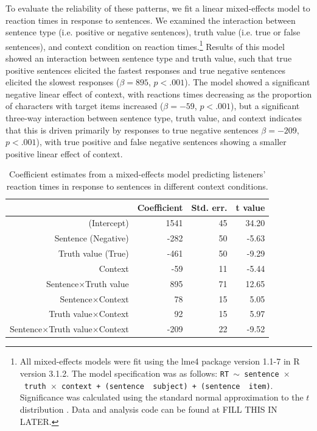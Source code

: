 \documentclass[man]{apa2}
\begin{document}
To evaluate the reliability of these patterns, we fit a linear mixed-effects model to reaction times in response to sentences.  We examined the interaction between sentence type (i.e. positive or negative sentences), truth value (i.e. true or false sentences), and context condition on reaction times.\footnote{All mixed-effects models were fit using the lme4 package version 1.1-7 in R version 3.1.2.  The model specification was as follows: \texttt{RT $\sim$ sentence~$\times$~truth~$\times$~context + (sentence~\textbar~subject) +  (sentence~\textbar~item)}.  Significance was calculated using the standard normal approximation to the $t$ distribution \cite{barr2013}. Data and analysis code can be found at FILL THIS IN LATER.}  Results of this model showed an interaction between sentence type and truth value, such that true positive sentences elicited the fastest responses and true negative sentences elicited the slowest responses ($\beta= 895$, $p< .001$).  The model showed a significant negative linear effect of context, with reactions times decreasing as the proportion of characters with target items increased ($\beta= -59$, $p< .001$), but a significant three-way interaction between sentence type, truth value, and context indicates that this is driven primarily by responses to true negative sentences $\beta= -209$, $p< .001$), with true positive and false negative sentences showing a smaller positive linear effect of context.  

\begin{table}[t]
\caption{Coefficient estimates from a mixed-effects model predicting listeners' reaction times in response to sentences in different context conditions.}
\begin{center}
\small\addtolength{\tabcolsep}{-5pt}
\begin{tabular}{rrrr}
  \hline
 & Coefficient & Std. err. & t value \\ 
  \hline
(Intercept) & 1541 & 45 & 34.20 \\ 
  Sentence (Negative) & -282 & 50 & -5.63  \\ 
  Truth value (True) & -461 & 50 & -9.29 \\
  Context & -59 & 11 & -5.44 \\ 
  Sentence$\times$Truth value & 895 & 71 & 12.65 \\
  Sentence$\times$Context & 78 & 15 & 5.05 \\
  Truth value$\times$Context & 92 & 15 & 5.97 \\
  Sentence$\times$Truth value$\times$Context & -209 & 22 & -9.52 \\
   \hline
\end{tabular}
\vspace{-1.5cm}
\end{center}
\end{table}
\end{document}
